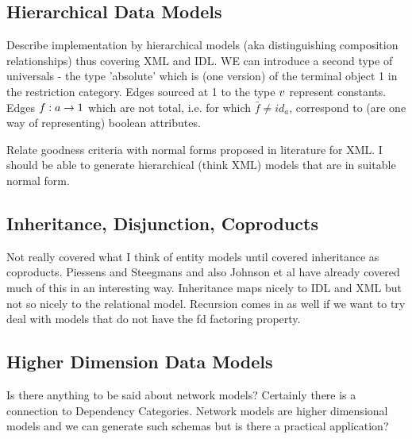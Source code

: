 \subsection{Hierarchical Data Models}
Describe implementation by hierarchical models (aka distinguishing composition relationships) thus covering XML and IDL.
WE can introduce a second type of universals - the type 'absolute' which is (one version) of the terminal object 1 in the restriction
category. Edges sourced at 1 to the type $v$ represent constants. Edges $f: a \rightarrow 1$ which are not total, i.e. for which
$\bar{f} \neq id_a$, correspond to (are one way of representing) boolean attributes.  

Relate goodness criteria with  normal forms proposed in literature for XML. I should be able to generate hierarchical
(think XML) models that are in suitable normal form.

\subsection{Inheritance, Disjunction, Coproducts}
Not really covered what I think of entity models until covered inheritance as coproducts.
Piessens and Steegmans and also Johnson et al have already covered much of this in an interesting way. 
Inheritance maps nicely to IDL and XML but not so nicely to the relational model.  Recursion comes in as well if we want to try deal with models that do not have the fd factoring property.

\subsection{Higher Dimension Data Models}
Is there anything to be said about network models? Certainly there is a connection to Dependency Categories.
Network models are higher dimensional models and we can generate such schemas but is there a practical application?  
 
